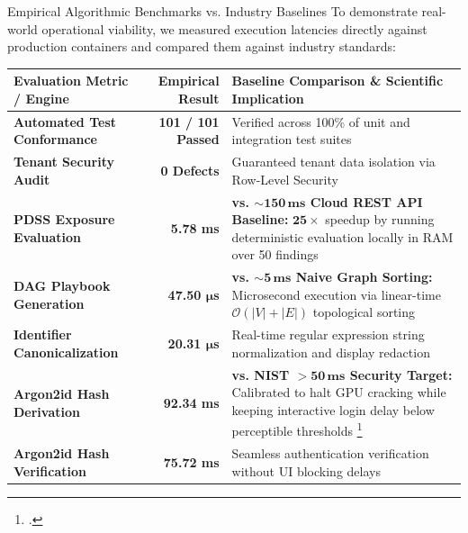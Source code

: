\documentclass[aspectratio=169,10pt]{beamer}
\begin{document}
\begin{frame}{Empirical Algorithmic Benchmarks vs. Industry Baselines}
  \small
  To demonstrate real-world operational viability, we measured execution latencies directly against production containers and compared them against industry standards:
  
  \vspace{0.15cm}
  \begin{table}
    \centering
    \scriptsize
    \begin{tabular}{l r >{\raggedright\arraybackslash}p{5.8cm}}
      \toprule
      \textbf{Evaluation Metric / Engine} & \textbf{Empirical Result} & \textbf{Baseline Comparison \& Scientific Implication} \\
      \midrule
      \textbf{Automated Test Conformance} & \textbf{101 / 101 Passed} & Verified across 100\% of unit and integration test suites \\
      \textbf{Tenant Security Audit} & \textbf{0 Defects} & Guaranteed tenant data isolation via Row-Level Security \\
      \textbf{PDSS Exposure Evaluation} & \textbf{5.78 ms} & \textbf{vs. $\mathbf{\sim 150\,\text{ms}}$ Cloud REST API Baseline:} $\mathbf{25\times}$ speedup by running deterministic evaluation locally in RAM over 50 findings \\
      \textbf{DAG Playbook Generation} & \textbf{47.50 $\boldsymbol{\mu}$s} & \textbf{vs. $\mathbf{\sim 5\,\text{ms}}$ Naive Graph Sorting:} Microsecond execution via linear-time $\mathcal{O}(|V|+|E|)$ topological sorting \\
      \textbf{Identifier Canonicalization} & \textbf{20.31 $\boldsymbol{\mu}$s} & Real-time regular expression string normalization and display redaction \\
      \textbf{Argon2id Hash Derivation} & \textbf{92.34 ms} & \textbf{vs. NIST $\mathbf{>50\,\text{ms}}$ Security Target:} Calibrated to halt GPU cracking while keeping interactive login delay below perceptible thresholds \footcite{RFC9106_Argon2} \\
      \textbf{Argon2id Hash Verification} & \textbf{75.72 ms} & Seamless authentication verification without UI blocking delays \\
      \bottomrule
    \end{tabular}
  \end{table}
\end{frame}

\end{document}
